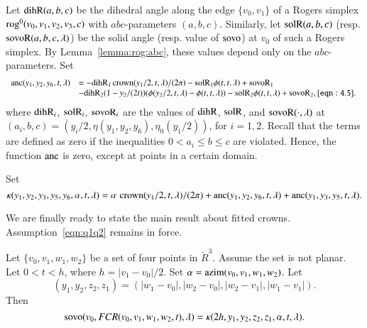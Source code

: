 Let ${\operatorname{dihR}}(a,b,c)$ be the dihedral angle along the edge
$\{v_0,v_1\}$ of a
Rogers simplex ${\operatorname{rog}}^0(v_0,v_1,v_2,v_3,c)$ with $abc$-parameters
$(a,b,c)$.  Similarly, let ${\operatorname{solR}}(a,b,c)$ (resp. ${\operatorname{sovoR}}(a,b,c,\lambda)$)
be the solid angle (resp. value of ${\operatorname{sovo}}$)
at $v_0$ of such a Rogers simplex.  By Lemma~\ref{lemma:rog:abc},
these values depend only on the $abc$-parameters.
Set
    \begin{equation}
    \begin{array}{lll}
    \anc(y_1,y_2,y_6,t,\lambda) &= 
     -\op{dihR}_1\cro(y_1/2,t,\lambda)/(2\pi)
        -\op{solR}_1\phi(t,t,\lambda)+\op{sovoR}_1\\
    &-\op{dihR}_2(1-y_2/(2t))(\phi(y_2/2,t,\lambda)-\phi(t,t,\lambda))
        -\op{solR}_2\phi(t,t,\lambda) + \op{sovoR}_2,
    \tlabel{eqn:4.5}
    \end{array}
    \end{equation}
where ${\operatorname{dihR}}_i$, ${\operatorname{solR}}_i$, ${\operatorname{sovoR}}_i$ are the values
of ${\operatorname{dihR}}$, ${\operatorname{solR}}$, and ${\operatorname{sovoR}}(\cdot,\lambda)$
at $(a_i,b,c) = (y_i/2,\eta(y_1,y_2,y_6),\eta_0(y_1/2))$, for $i=1,2$.
Recall that the terms are defined as zero if the inequalities
$0 < a_i \le b\le c$ are violated.  Hence, the function $\operatorname{anc}$ is
zero, except at points in a certain domain.

Set
    $$\kappa(y_1,y_2,y_3,y_5,y_6,\alpha,t,\lambda) =
   \alpha\,\operatorname{crown}(y_1/2,t,\lambda)/(2\pi) +
        \operatorname{anc}(y_1,y_2,y_6,t,\lambda)+\operatorname{anc}(y_1,y_3,y_5,t,\lambda).
    $$

We are finally ready to state the main result about fitted crowns.
Assumption~\ref{eqn:q1q2} remains in force.

\begin{lemma}\label{lemma:sovo:FCR}
Let $\{v_0,v_1,w_1,w_2\}$ be a set of four points in $\ring{R}^3$.
Assume the set is not planar.
Let $0 < t < h$, where $h = |v_1-v_0|/2$.
Set $\alpha = {\operatorname{azim}}(v_0,v_1,w_1,w_2)$.
Let 
 $$(y_1,y_2,z_2,z_1) =
   (|w_1-v_0|,|w_2-v_0|,|w_2-v_1|,|w_1-v_1|).
 $$
Then
$$
{\operatorname{sovo}}(v_0,FCR(v_0,v_1,w_1,w_2,t),\lambda) =
 \kappa(2h,y_1,y_2,z_2,z_1,\alpha,t,\lambda).
$$
\end{lemma}

